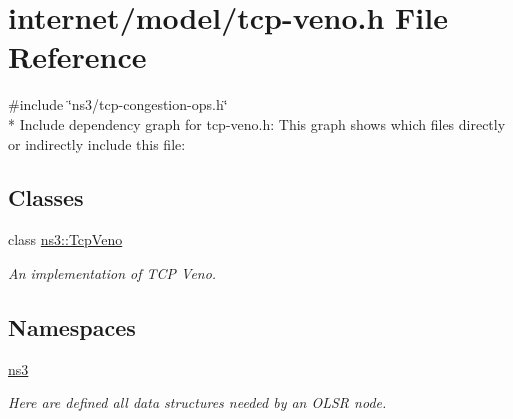 \hypertarget{tcp-veno_8h}{}\section{internet/model/tcp-\/veno.h File Reference}
\label{tcp-veno_8h}
{\ttfamily \#include \char`\"{}ns3/tcp-\/congestion-\/ops.\+h\char`\"{}}\\*
Include dependency graph for tcp-\/veno.h\+:
This graph shows which files directly or indirectly include this file\+:
\subsection*{Classes}
\begin{DoxyCompactItemize}
\item 
class \hyperlink{classns3_1_1TcpVeno}{ns3\+::\+Tcp\+Veno}
\begin{DoxyCompactList}\small\item\em An implementation of T\+CP Veno. \end{DoxyCompactList}\end{DoxyCompactItemize}
\subsection*{Namespaces}
\begin{DoxyCompactItemize}
\item 
 \hyperlink{namespacens3}{ns3}
\begin{DoxyCompactList}\small\item\em Here are defined all data structures needed by an O\+L\+SR node. \end{DoxyCompactList}\end{DoxyCompactItemize}
